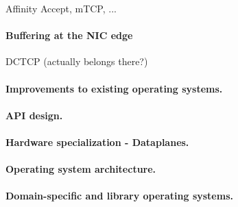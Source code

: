 \todo Affinity Accept, mTCP, ...

\paragraph{Buffering at the NIC edge}

\todo DCTCP (actually belongs there?)


\paragraph{Improvements to existing operating systems.}

\paragraph{API design.}


\paragraph{Hardware specialization - Dataplanes.}

\paragraph{Operating system architecture.}

\paragraph{Domain-specific and library operating systems.}
